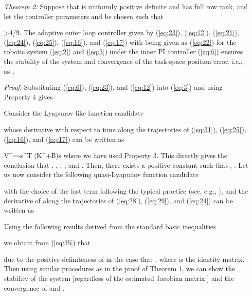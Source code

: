 \documentclass[9pt,technote]{IEEEtran}
\def \be {}
\begin{document}
\emph{Theorem 2: } Suppose that  is uniformly positive definite and  has full row rank, and let the controller parameters  and  be chosen such that
\be
\label{eq:30}
\beta>4\gamma/9.
\ee
The adaptive outer loop controller given by (\ref{eq:23}), (\ref{eq:12}), (\ref{eq:21}), (\ref{eq:24}), (\ref{eq:25}), (\ref{eq:16}), and (\ref{eq:17}) with  being given as (\ref{eq:22}) for the robotic system (\ref{eq:2}) and (\ref{eq:3}) under the inner PI controller (\ref{eq:6}) ensures the stability of the system and convergence of the task-space position error, i.e.,  as .

\emph{Proof:} Substituting (\ref{eq:6}), (\ref{eq:23}), and (\ref{eq:12}) into (\ref{eq:3}) and using Property 4 gives

Consider the Lyapunov-like function candidate

whose derivative with respect to time along the trajectories of (\ref{eq:31}), (\ref{eq:25}), (\ref{eq:16}), and (\ref{eq:17}) can be written as
\be
\dot V^\ast=-s^T (K^\ast +B)s
\ee
where we have used Property 3. This directly gives the conclusion that , , , , and . Then, there exists a positive constant  such that , . Let us now consider the following quasi-Lyapunov function candidate

with the choice of the last term following the typical practice (see, e.g., \cite[p.~118]{Lozano2000_Book}), and the derivative of  along the trajectories of (\ref{eq:28}), (\ref{eq:29}), and (\ref{eq:24}) can be written as

Using the following results derived from the standard basic inequalities

we obtain from (\ref{eq:35}) that

due to the positive definiteness of  in the case that , where  is the  identity matrix. Then using similar procedures as in the proof of Theorem 1, we can show the stability of the system [regardless of the estimated Jacobian matrix ] and the convergence of  and . \hfill{\small }
\end{document}

